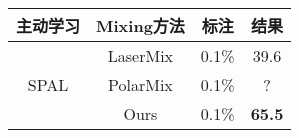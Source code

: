 \begin{table}[H]
	\renewcommand{\arraystretch}{1}
    \centering
    \setlength{\tabcolsep}{8mm}
    \label{tab:4-6}
    \wuhao
    \begin{tabular}{cccc}
        \toprule[1.5pt]
        \textbf{主动学习} & \textbf{Mixing方法} & \textbf{标注} & \textbf{结果} \\
        \midrule
        \multirow{3}{*}{SPAL} & LaserMix & 0.1\% & 39.6 \\
        ~& PolarMix & 0.1\% & ? \\
        ~& Ours & 0.1\% & \textbf{65.5} \\
        \bottomrule[1.5pt]
    \end{tabular}
\end{table}
